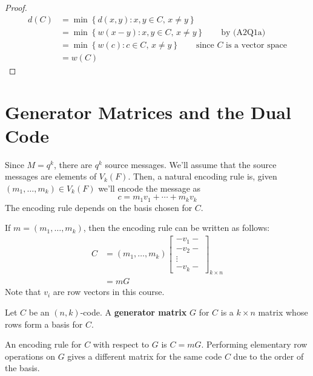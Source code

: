 \begin{proof}
    \begin{align*}
        d(C)
         & =\min \left\{ d(x,y):x,y\in C,\,x\neq y\right\}                                     \\
         & =\min \left\{ w(x-y):x,y\in C,\,x\neq y\right\}\qquad\text{by (A2Q1a)}              \\
         & =\min \left\{ w(c):c\in C,\,x\neq y\right\}\qquad\text{since $C$ is a vector space} \\
         & =w(C)
    \end{align*}
\end{proof}

\section{Generator Matrices and the Dual Code}

Since $ M=q^k $, there are $ q^k $ source messages. We'll assume that the source
messages are elements of $ V_k(F) $. Then, a natural encoding rule is,
given $ (m_1,\ldots ,m_k)\in V_k(F) $ we'll encode the message as
\[ c=m_1v_1+\cdots+m_kv_k \]
The encoding rule depends on the basis chosen for $ C $.

If $ m=(m_1,\ldots ,m_k) $, then the encoding rule can be written as follows:
\begin{align*}
    C & =(m_1,\ldots ,m_k)
    \begin{bmatrix}
        -v_1-  \\
        -v_2-  \\
        \vdots \\
        -v_k-
    \end{bmatrix}_{k\times n} \\
      & =mG
\end{align*}
Note that $ v_i $ are row vectors in this course.

\begin{defbox}
    \begin{definition}
        Let $ C $ be an $ (n,k) $-code. A \textbf{generator matrix} $ G $
        for $ C $ is a $ k\times n $ matrix whose rows form a basis for $ C $.
    \end{definition} \end{defbox}

 An encoding rule for $ C $ with respect to $ G $ is $ C=mG $.
Performing elementary row operations on $ G $ gives
a different matrix for the same code $ C $ due to the order of the basis.